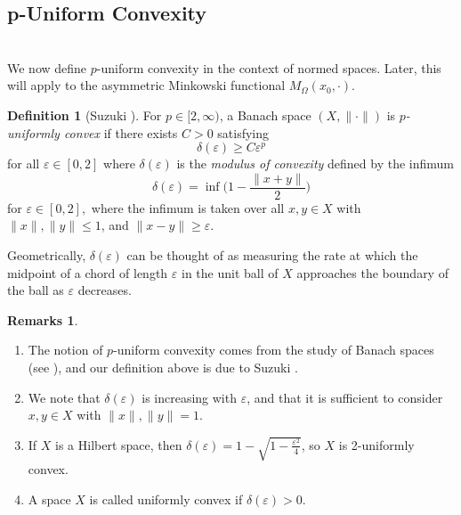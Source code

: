 \documentclass[letterpaper, 11pt, reqno]{amsart}
\theoremstyle{definition}
\newtheorem{dfn}[thm]{Definition}
\newtheorem{rems}[thm]{Remarks}
\begin{document}
\subsection{p-Uniform Convexity}\hfill\\

We now define $p$-uniform convexity in the context of normed spaces. Later, this will apply to the asymmetric Minkowski functional $M_\Omega(x_0,\cdot)$.

\begin{dfn}[Suzuki \cite{Suzuki}]\label{def:puc}
    For $p \in [2, \infty)$, a Banach space $(X, \|\cdot\|)$ is \textit{$p$-uniformly convex} if there exists $C > 0$ satisfying 
    \begin{equation*}
        \delta(\varepsilon) \geq C\varepsilon^p
    \end{equation*}
    for all $\varepsilon \in [0,2]$ where $\delta(\varepsilon)$ is the \textit{modulus of convexity} defined by the infimum
    \begin{equation*}
        \delta(\varepsilon) = \inf \bigg(1-\frac{\|x+y\|}{2}\bigg)
    \end{equation*}
    for $\varepsilon \in [0,2],$ where the infimum is taken over all $x,y \in X$ with $\|x\|, \|y\| \leq 1$, and $\|x-y\| \geq \varepsilon$. 
\end{dfn}

Geometrically, $\delta(\varepsilon)$ can be thought of as measuring the rate at which the midpoint of a chord of length $\varepsilon$ in the unit ball of $X$ approaches the boundary of the ball as $\varepsilon$ decreases.

\begin{rems}\leavevmode
\begin{enumerate}
    \item The notion of $p$-uniform convexity comes from the study of Banach spaces (see \cite{BCL}), and our definition above is due to Suzuki \cite{Suzuki}.
    \item We note that $\delta(\varepsilon)$ is increasing with $\varepsilon$, and that it is sufficient to consider $x, y \in X$ with $\|x\|, \|y\| = 1$.
    \item If $X$ is a Hilbert space, then $\delta(\varepsilon) = 1-\sqrt{1-\frac{\varepsilon^2}{4}}$, so $X$ is 2-uniformly convex.
    \item A space $X$ is called uniformly convex if $\delta(\varepsilon) > 0.$
\end{enumerate}
\end{rems}
\end{document}
